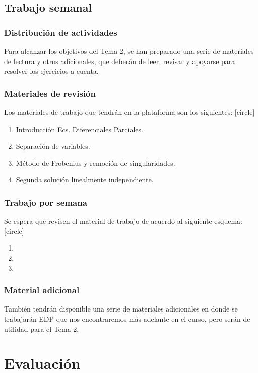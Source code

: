 \documentclass[12pt]{beamer}
\begin{document}
\subsection{Trabajo semanal}
\begin{frame}
\frametitle{Distribución de actividades}
Para alcanzar los objetivos del Tema 2, se han preparado una serie de materiales de lectura y otros adicionales, que deberán de leer, revisar y apoyarse para resolver los ejercicios a cuenta.
\end{frame}
\begin{frame}
\frametitle{Materiales de revisión}
Los materiales de trabajo que tendrán en la plataforma son los siguientes:
[circle]
\begin{enumerate}[<+->]
\item Introducción Ecs. Diferenciales Parciales.
\item Separación de variables.
\item Método de Frobenius y remoción de singularidades.
\item Segunda solución linealmente independiente.
\end{enumerate}
\end{frame}
\begin{frame}
\frametitle{Trabajo por semana}
Se espera que revisen el material de trabajo de acuerdo al siguiente esquema:
[circle]
\begin{enumerate}[<+->]
\item %
\item %
\item %
\end{enumerate}
\end{frame}
\begin{frame}
\frametitle{Material adicional}
También tendrán disponible una serie de materiales adicionales en donde se trabajarán EDP que nos encontraremos más adelante en el curso, pero serán de utilidad para el Tema 2.
\end{frame}
\section{Evaluación}
\end{document}
